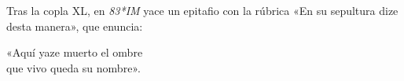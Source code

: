 \documentclass[11pt,a4paper,twoside]{article}
\newcommand{\comillas}[1]{«#1»}
\newcommand{\im}{\emph{83*IM}}
\begin{document}
\vspace{11pt} Tras la copla XL, en {\im} yace un epitafio con la rúbrica \comillas{En su sepultura dize desta manera}, que enuncia:\vspace{5pt}\par
%
\comillas{Aquí yaze muerto el ombre\\
	que vivo queda su nombre}.
\relax
\vfill
%
\end{document}
